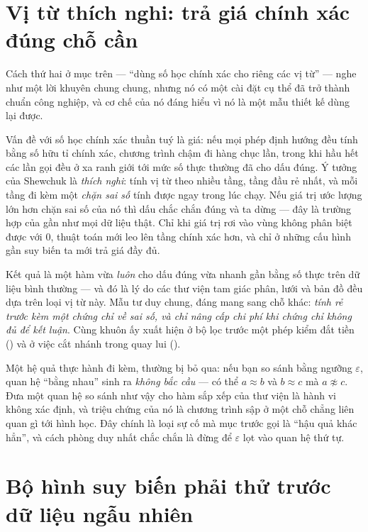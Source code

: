 \documentclass[../../algorithm.tex]{subfiles}
\begin{document}
\section{Vị từ thích nghi: trả giá chính xác đúng chỗ cần}

Cách thứ hai ở mục trên --- ``dùng số học chính xác cho riêng các vị từ'' --- nghe như một lời khuyên chung chung, nhưng nó có một cài đặt cụ thể đã trở thành chuẩn công nghiệp, và cơ chế của nó đáng hiểu vì nó là một mẫu thiết kế dùng lại được.

Vấn đề với số học chính xác thuần tuý là giá: nếu mọi phép định hướng đều tính bằng số hữu tỉ chính xác, chương trình chậm đi hàng chục lần, trong khi hầu hết các lần gọi đều ở xa ranh giới tới mức số thực thường đã cho dấu đúng. Ý tưởng của Shewchuk\cite{shewchuk1997} là \emph{thích nghi}: tính vị từ theo nhiều tầng, tầng đầu rẻ nhất, và mỗi tầng đi kèm một \emph{chặn sai số} tính được ngay trong lúc chạy. Nếu giá trị ước lượng lớn hơn chặn sai số của nó thì dấu chắc chắn đúng và ta dừng --- đây là trường hợp của gần như mọi dữ liệu thật. Chỉ khi giá trị rơi vào vùng không phân biệt được với 0, thuật toán mới leo lên tầng chính xác hơn, và chỉ ở những cấu hình gần suy biến ta mới trả giá đầy đủ.

Kết quả là một hàm vừa \emph{luôn} cho dấu đúng vừa nhanh gần bằng số thực trên dữ liệu bình thường --- và đó là lý do các thư viện tam giác phân, lưới và bản đồ đều dựa trên loại vị từ này. Mẫu tư duy chung, đáng mang sang chỗ khác: \emph{tính rẻ trước kèm một chứng chỉ về sai số, và chỉ nâng cấp chi phí khi chứng chỉ không đủ để kết luận}. Cùng khuôn ấy xuất hiện ở bộ lọc trước một phép kiểm đắt tiền () và ở việc cắt nhánh trong quay lui ().

Một hệ quả thực hành đi kèm, thường bị bỏ qua: nếu bạn so sánh bằng ngưỡng \(\varepsilon\), quan hệ ``bằng nhau'' sinh ra \emph{không bắc cầu} --- có thể \(a\approx b\) và \(b\approx c\) mà \(a\not\approx c\). Đưa một quan hệ so sánh như vậy cho hàm sắp xếp của thư viện là hành vi không xác định, và triệu chứng của nó là chương trình sập ở một chỗ chẳng liên quan gì tới hình học. Đây chính là loại sự cố mà mục trước gọi là ``hậu quả khác hẳn'', và cách phòng duy nhất chắc chắn là đừng để \(\varepsilon\) lọt vào quan hệ thứ tự.

\section{Bộ hình suy biến phải thử trước dữ liệu ngẫu nhiên}
\end{document}
